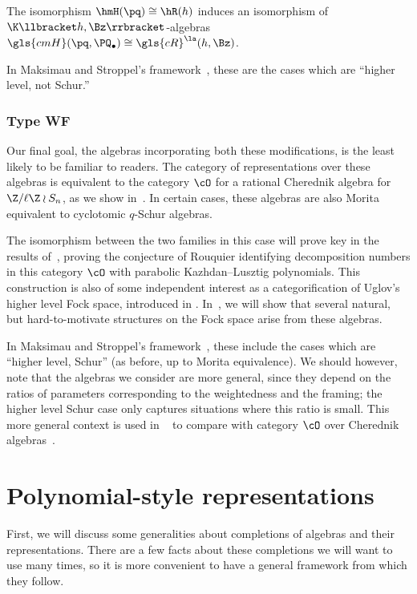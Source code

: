 \begin{theorem}
 The isomorphism $\hmH(\pq)\cong \hR(h)$ induces an isomorphism of
 $\K\llbracket h,\Bz\rrbracket $-algebras $\gls{cmH}(\pq,\PQ_\bullet)\cong \gls{cR}^{\la}(h,\Bz)$.
\end{theorem}


In Maksimau and Stroppel's framework~\cite{MS18}, these are the cases which are
 ``higher level, not Schur.''

\subsubsection*{Type WF} 

Our final goal, the algebras incorporating both these modifications,
is the least likely to be familiar to readers. The category of
representations over these algebras is equivalent to the category
$\cO$ for a rational Cherednik algebra for $\Z/\ell\Z \wr S_n $, as
we show in~\cite{WebRou}. In certain cases, these algebras are also
Morita equivalent to cyclotomic $q$-Schur algebras.

The isomorphism between the two families in
this case will prove key in the results of~\cite{WebRou}, proving the
conjecture of Rouquier identifying decomposition numbers in this
category $\cO$ with parabolic Kazhdan--Lusztig polynomials. This
construction is also of some independent interest as a
categorification of Uglov's higher level Fock space, introduced in
\cite{Uglov}. In~\cite{WebRou}, we will show that several natural,
but hard-to-motivate structures on the Fock space arise from these
algebras.

In Maksimau and Stroppel's framework~\cite{MS18}, these include the cases which are
 ``higher level, Schur'' (as before, up to Morita equivalence). We should however, note that the algebras
 we consider are more general, since they depend on the ratios of
 parameters corresponding to the weightedness and the framing; the
 higher level Schur case only captures situations where this ratio is
 small. This more general context is used in
~\cite{WebRou,Webalt} to compare with category $\cO$ over Cherednik
 algebras~\cite{GGOR}.




\section{Polynomial-style representations}
\label{sec:polyn-style-repr}
First, we will discuss some generalities about completions of algebras
and their representations. There are a few facts about these
completions we will want to use many times, so it is more convenient
to have a general framework from which they follow. 

